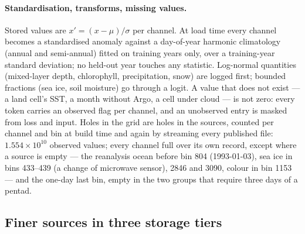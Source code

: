 \documentclass[10pt]{article}
\begin{document}
\paragraph{Standardisation, transforms, missing values.} Stored values are
$x'=(x-\mu)/\sigma$ per channel. At load time every channel becomes a
standardised anomaly against a day-of-year harmonic climatology (annual and
semi-annual) fitted on training years only, over a training-year standard
deviation; no held-out year touches any statistic. Log-normal quantities
(mixed-layer depth, chlorophyll, precipitation, snow) are logged first;
bounded fractions (sea ice, soil moisture) go through a logit. A value that
does not exist --- a land cell's SST, a month without Argo, a cell under
cloud --- is not zero: every token carries an observed flag per channel, and
an unobserved entry is masked from loss and input. Holes in the grid are
holes in the sources, counted per channel and bin at build time and again by
streaming every published file: $1.554\times10^{10}$ observed values; every
channel full over its own record, except where a source is empty --- the
reanalysis ocean before bin 804 (1993-01-03), sea ice in bins 433--439 (a
change of microwave sensor), 2846 and 3090, colour in bin 1153 --- and the
one-day last bin, empty in the two groups that require three days of a
pentad.

\subsection{Finer sources in three storage tiers}\label{sec:data-fine}
\end{document}
